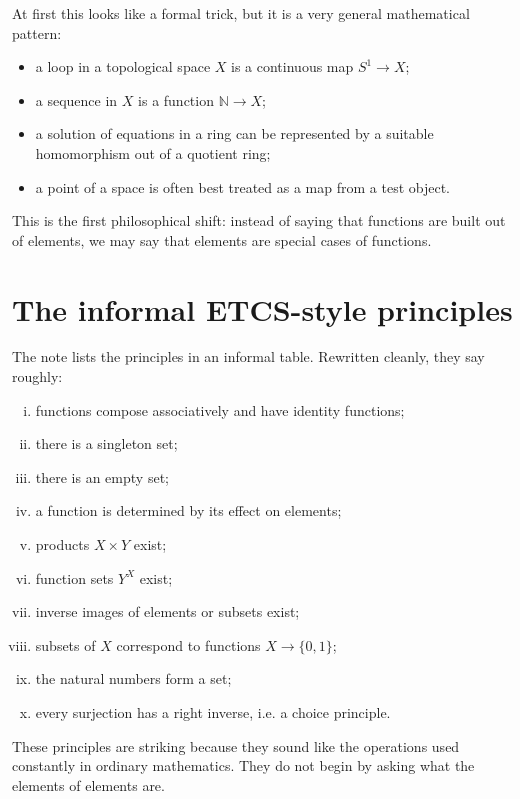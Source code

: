 At first this looks like a formal trick, but it is a very general mathematical pattern:
\begin{itemize}
  \item a loop in a topological space \(X\) is a continuous map \(S^1\to X\);
  \item a sequence in \(X\) is a function \(\mathbb N\to X\);
  \item a solution of equations in a ring can be represented by a suitable homomorphism out of a quotient ring;
  \item a point of a space is often best treated as a map from a test object.
\end{itemize}

\begin{remark}
This is the first philosophical shift: instead of saying that functions are built out of elements, we may say that elements are special cases of functions.
\end{remark}

\section{The informal ETCS-style principles}

The note lists the principles in an informal table.  Rewritten cleanly, they say roughly:
\begin{enumerate}[(i)]
  \item functions compose associatively and have identity functions;
  \item there is a singleton set;
  \item there is an empty set;
  \item a function is determined by its effect on elements;
  \item products \(X\times Y\) exist;
  \item function sets \(Y^X\) exist;
  \item inverse images of elements or subsets exist;
  \item subsets of \(X\) correspond to functions \(X\to\{0,1\}\);
  \item the natural numbers form a set;
  \item every surjection has a right inverse, i.e. a choice principle.
\end{enumerate}

These principles are striking because they sound like the operations used constantly in ordinary mathematics.  They do not begin by asking what the elements of elements are.

